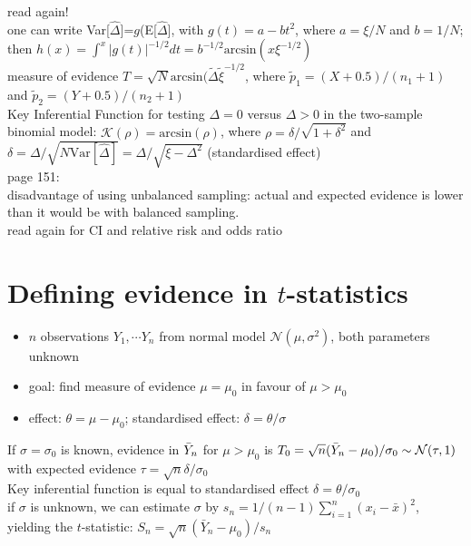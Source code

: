read again!\\

one can write Var[$\hat{\Delta}$]=$g$(E[$\hat{\Delta}$], with $g(t) = a-bt^2$, where $a = \xi/N$ and $b = 1/N$; then $h(x) = \int^x|g(t)|^{-1/2}dt = b^{-1/2}\text{arcsin}(x\xi^{-1/2})$\\
measure of evidence $T = \sqrt{N}\text{arcsin}(\tilde{\Delta}\tilde{\xi}^{-1/2}$, where $\tilde{p}_1 = (X+0.5)/(n_1+1)$ and $\tilde{p}_2 = (Y+0.5)/(n_2+1)$\\
Key Inferential Function for testing $\Delta = 0$ versus $\Delta > 0$ in the two-sample binomial model: $\mathcal{K}(\rho)=\text{arcsin}(\rho)$, where $\rho = \delta/\sqrt{1+\delta^2}$ and $\delta = \Delta/\sqrt{N \text{Var}[\hat{\Delta}]} = \Delta/\sqrt{\xi-\Delta^2}$ (standardised effect)\\

page 151:\\
disadvantage of using unbalanced sampling: actual and expected evidence is lower than it would be with balanced sampling.\\

read again for CI and relative risk and odds ratio\\

\section{Defining evidence in $t$-statistics}
\begin{itemize}
    \item $n$ observations $Y_1,\cdots Y_n$ from normal model $\mathcal{N}(\mu,\sigma^2)$, both parameters unknown
    \item goal: find measure of evidence $\mu = \mu_0$ in favour of $\mu > \mu_0$
    \item effect: $\theta = \mu-\mu_0$; standardised effect: $\delta = \theta/\sigma$
\end{itemize}

If $\sigma=\sigma_0$ is known, evidence in $\Bar{Y}_n$ for $\mu > \mu_0$ is $T_0 = \sqrt{n}(\Bar{Y}_n - \mu_0)/\sigma_0 \sim \mathcal{N}(\tau,1)$ with expected evidence $\tau = \sqrt{n}\delta/\sigma_0$\\
Key inferential function is equal to standardised effect $\delta=\theta/\sigma_0$\\

if $\sigma$ is unknown, we can estimate $\sigma$ by $s_n = 1/(n-1) \sum_{i=1}^n (x_i-\bar{x})^2$, yielding the $t$-statistic: $S_n = \sqrt{n}(\bar{Y}_n-\mu_0)/s_n$\\

